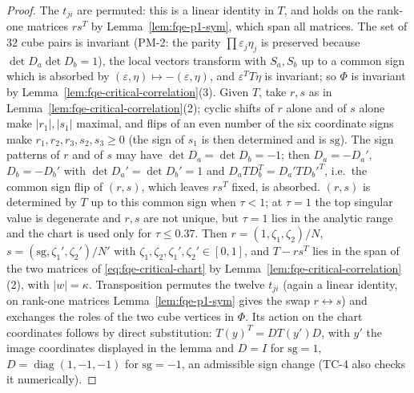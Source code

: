 \begin{proof}
The $t_{ji}$ are permuted: this is a linear identity in $T$, and holds on the rank-one matrices $rs^T$ by
Lemma~\ref{lem:fqe-p1-sym}, which span all matrices.  The set of $32$ cube pairs is invariant (PM-2: the parity
$\prod\varepsilon_j\eta_j$ is preserved because $\det D_a\det D_b=1$), the local vectors transform with $S_a,S_b$ up to a
common sign which is absorbed by $(\varepsilon,\eta)\mapsto-(\varepsilon,\eta)$, and $\varepsilon^TT\eta$ is invariant;
so $\Phi$ is invariant by Lemma~\ref{lem:fqe-critical-correlation}(3).  Given $T$, take $r,s$ as in
Lemma~\ref{lem:fqe-critical-correlation}(2); cyclic shifts of $r$ alone and of $s$ alone make $|r_1|,|s_1|$ maximal, and
flips of an even number of the six coordinate signs make $r_1,r_2,r_3,s_2,s_3\ge0$ (the sign of $s_1$ is then determined and
is $\mathrm{sg}$).  The sign patterns of $r$ and of $s$ may have $\det D_a=\det D_b=-1$; then $D_a=-D_a'$, $D_b=-D_b'$ with
$\det D_a'=\det D_b'=1$ and $D_aTD_b^T=D_a'TD_b'^T$, i.e.\ the common sign flip of $(r,s)$, which leaves $rs^T$ fixed, is absorbed.
$(r,s)$ is determined by $T$ up to this common sign when $\tau<1$; at $\tau=1$ the top singular value is degenerate and $r,s$ are
not unique, but $\tau=1$ lies in the analytic range and the chart is used only for $\tau\le0.37$.  Then $r=(1,\zeta_1,\zeta_2)/N$, $s=(\mathrm{sg},\zeta_1',\zeta_2')/N'$ with $\zeta_1,\zeta_2,\zeta_1',\zeta_2'\in[0,1]$, and $T-rs^T$ lies in the
span of the two matrices of \eqref{eq:fqe-critical-chart} by Lemma~\ref{lem:fqe-critical-correlation}(2), with $|w|=\kappa$.
Transposition permutes the twelve $t_{ji}$ (again a linear identity, on rank-one matrices Lemma~\ref{lem:fqe-p1-sym} gives the swap
$r\leftrightarrow s$) and exchanges the roles of the two cube vertices in $\Phi$. Its action on the chart coordinates follows by
direct substitution: $T(y)^T=DT(y')D$, with $y'$ the image coordinates displayed in the lemma and $D=I$ for $\mathrm{sg}=1$,
$D=\operatorname{diag}(1,-1,-1)$ for $\mathrm{sg}=-1$, an admissible sign change (TC-4 also checks it numerically).
\end{proof}

